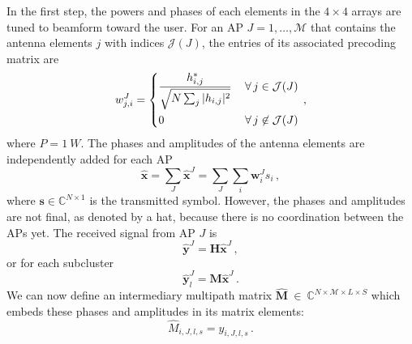 \documentclass{IEEEtran}
\begin{document}
In the first step, the powers and phases of each elements in the $4 \times 4$ arrays are tuned to beamform toward the user. For an \gls{AP} $J = 1, \dots ,\mathcal{M}$ that contains the antenna elements $j$ with indices $\mathcal{J}(J)$, the entries of its associated precoding matrix are 
\begin{equation}
\label{eq:prec1}
   w_{j,i}^J = 
   \begin{dcases}
       \frac{h_{i,j}^*}{\sqrt{N\sum_j | h_{i,j} |^2}} \, & \forall \, j \in \mathcal{J}(J) \\
       0 \, & \forall \, j \not\in \mathcal{J}(J)
   \end{dcases}
    \, ,
\end{equation}
where $P = \SI{1}{W}$. The phases and amplitudes of the antenna elements are independently added for each \gls{AP}
\begin{equation}
\label{eq:x_hat_sum}
    \widehat{\boldsymbol{x}} = \sum_J \widehat{\boldsymbol{x}}^J = \sum_J\sum_i \mathbf{w}^J_{i} s_i \, ,
\end{equation}
where $\boldsymbol{s} \in \mathbb{C}^{N\times1}$ is the transmitted symbol. However, the phases and amplitudes are not final, as denoted by a hat, because there is no coordination between the \glspl{AP} yet. The received signal from \gls{AP} $J$ is
\begin{equation}
\label{eq:y_hat_J}
    \widehat{\boldsymbol{y}}^J = \mathbf{H}\widehat{\boldsymbol{x}}^J \, ,
\end{equation}
or for each subcluster
\begin{equation}
\label{eq:y_hat_J_l}
    \widehat{\boldsymbol{y}}^J_l = \mathbf{M}\widehat{\boldsymbol{x}}^J \, .
\end{equation}
We can now define an intermediary multipath matrix $\widehat{\mathbf{M}}~\in~\mathbb{C}^{N\times \mathcal{M} \times L \times S}$ which embeds these phases and amplitudes in its matrix elements:
\begin{equation}
\label{eq:M_hat}
    \widehat{M}_{i,J,l,s} = \widehat{y}_{i,J,l,s} \, .
\end{equation}
\end{document}
